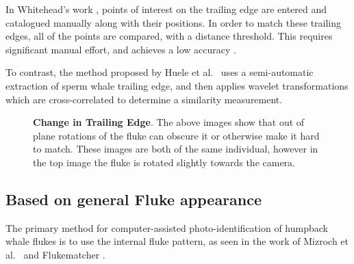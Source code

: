 In Whitehead's work \cite{whitehead1990computer}, points of interest on the trailing edge are entered and catalogued manually along with their positions.
In order to match these trailing edges, all of the points are compared, with a distance threshold.
This requires significant manual effort, and achieves a low accuracy \cite{beekmans2005comparison}.

To contrast, the method proposed by Huele et al.\ \cite{huele2000finding} uses a semi-automatic extraction of sperm whale trailing edge, and then applies wavelet transformations which are cross-correlated to determine a similarity measurement.

\begin{figure}[t]%
\centering
{}
\newline
{}
\caption[]{\textbf{Change in Trailing Edge}. The above images show that out of plane rotations of the fluke can obscure it or otherwise make it hard to match. These images are both of the same individual, however in the top image the fluke is rotated slightly towards the camera.}
\label{fig:unclear_te}
\end{figure}

\subsection{Based on general Fluke appearance}


The primary method for computer-assisted photo-identification of humpback whale flukes is to use the internal fluke pattern, as seen in the work of Mizroch et al.\ \cite{mizroch1990computer} and Flukematcher \cite{kniest2010fluke}. 


